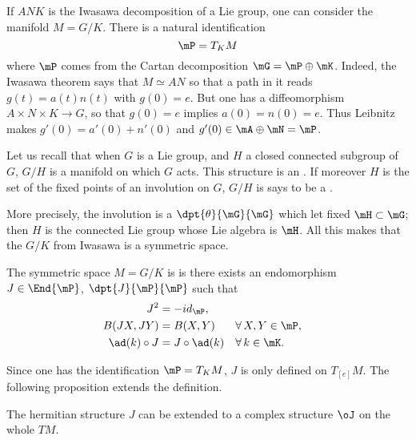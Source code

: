 If $ANK$ is the Iwasawa decomposition of a Lie group, one can consider the manifold $M=G/K$. There is a natural identification
\[
   \mP=T_KM
\]
where $\mP$ comes from the Cartan decomposition $\mG=\mP\oplus\mK$. Indeed, the Iwasawa theorem says that $M\simeq AN$ so that a path in it reads $g(t)=a(t)n(t)$ with $g(0)=e$. But one has a diffeomorphism $A\times N\times K\to G$, so that $g(0)=e$ implies $a(0)=n(0)=e$. Thus Leibnitz makes $g'(0)=a'(0)+n'(0)$ and $g'(0)\in\mA\oplus\mN=\mP$.

Let us recall that when $G$ is a Lie group, and $H$ a closed connected subgroup of $G$, $G/H$ is a manifold on which $G$ acts. This structure is an . If moreover $H$ is the set of the fixed points of an involution on $G$, $G/H$ is says to be a .

More precisely, the involution is a $\dpt{\theta}{\mG}{\mG}$ which let fixed $\mH\subset\mG$; then $H$ is the connected Lie group whose Lie algebra is $\mH$. All this makes that the $G/K$ from Iwasawa is a symmetric space.

\begin{definition}		\label{DefSymHermMGKalg}
  The symmetric space $M=G/K$ is  is there exists an endomorphism $J\in\End{\mP}$, $\dpt{J}{\mP}{\mP}$ such that
\begin{subequations}  
\begin{align}  
  J^2&=-id_{\mP},                                           \label{eq:herm_1} \\
  B(JX,JY)&=B(X,Y)            && \forall\,X,Y\in\mP,    \label{eq:herm_2}\\
  \ad (k)\circ J&=J\circ\ad(k)&& \forall\,k\in\mK.      \label{eq:herm_3}
\end{align}    
\end{subequations}
\label{def:hermitien}
\end{definition}

Since one has the identification $\mP=T_KM$, $J$ is only defined on $T_{[e]}M$. The following proposition extends the definition.

\begin{proposition}
The hermitian structure $J$ can be extended to a complex structure $\oJ$ on the whole $TM$.
\label{prop:ext_J}
 \end{proposition}

